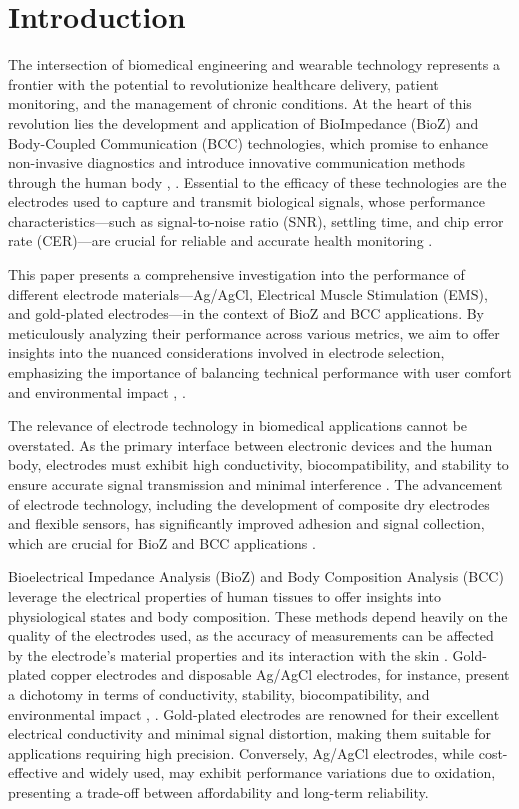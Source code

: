 \section{Introduction}
{
    The intersection of biomedical engineering and wearable technology represents a frontier with the potential to revolutionize healthcare delivery, patient monitoring, and the management of chronic conditions. At the heart of this revolution lies the development and application of BioImpedance (BioZ) and Body-Coupled Communication (BCC) technologies, which promise to enhance non-invasive diagnostics and introduce innovative communication methods through the human body \cite{Grimnes2000bioimpedance}, \cite{Tallgren2005Evaluation}. Essential to the efficacy of these technologies are the electrodes used to capture and transmit biological signals, whose performance characteristics—such as signal-to-noise ratio (SNR), settling time, and chip error rate (CER)—are crucial for reliable and accurate health monitoring \cite{ormanis2020towards}.

    This paper presents a comprehensive investigation into the performance of different electrode materials—Ag/AgCl, Electrical Muscle Stimulation (EMS), and gold-plated electrodes—in the context of BioZ and BCC applications. By meticulously analyzing their performance across various metrics, we aim to offer insights into the nuanced considerations involved in electrode selection, emphasizing the importance of balancing technical performance with user comfort and environmental impact \cite{Zen2004Amino}, \cite{NunezBajo2017Integration}.
    
    The relevance of electrode technology in biomedical applications cannot be overstated. As the primary interface between electronic devices and the human body, electrodes must exhibit high conductivity, biocompatibility, and stability to ensure accurate signal transmission and minimal interference \cite{lee2021recent}. The advancement of electrode technology, including the development of composite dry electrodes and flexible sensors, has significantly improved adhesion and signal collection, which are crucial for BioZ and BCC applications \cite{rabbani2023low}.
    
    Bioelectrical Impedance Analysis (BioZ) and Body Composition Analysis (BCC) leverage the electrical properties of human tissues to offer insights into physiological states and body composition. These methods depend heavily on the quality of the electrodes used, as the accuracy of measurements can be affected by the electrode's material properties and its interaction with the skin \cite{s23094251}. Gold-plated copper electrodes and disposable Ag/AgCl electrodes, for instance, present a dichotomy in terms of conductivity, stability, biocompatibility, and environmental impact \cite{Zhao2018Fabrication}, \cite{Almeida2014On-site}. Gold-plated electrodes are renowned for their excellent electrical conductivity and minimal signal distortion, making them suitable for applications requiring high precision. Conversely, Ag/AgCl electrodes, while cost-effective and widely used, may exhibit performance variations due to oxidation, presenting a trade-off between affordability and long-term reliability.
    
}
